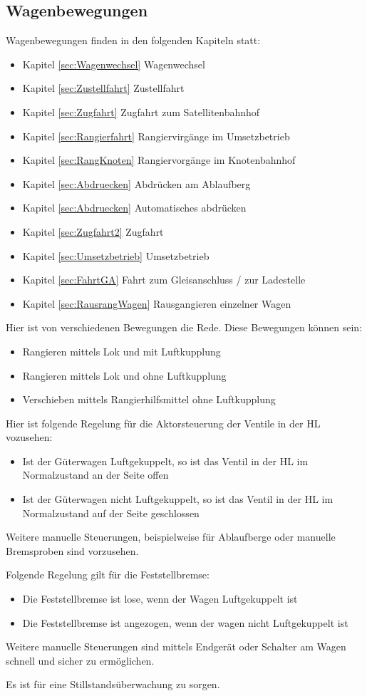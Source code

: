 \subsection{Wagenbewegungen}
Wagenbewegungen finden in den folgenden Kapiteln statt:
\begin{itemize}
    \item Kapitel \ref{sec:Wagenwechsel} Wagenwechsel
    \item Kapitel \ref{sec:Zustellfahrt} Zustellfahrt
    \item Kapitel \ref{sec:Zugfahrt} Zugfahrt zum Satellitenbahnhof
    \item Kapitel \ref{sec:Rangierfahrt} Rangiervirgänge im Umsetzbetrieb
    \item Kapitel \ref{sec:RangKnoten} Rangiervorgänge im Knotenbahnhof
    \item Kapitel \ref{sec:Abdruecken} Abdrücken am Ablaufberg
    \item Kapitel \ref{sec:Abdruecken} Automatisches abdrücken
    \item Kapitel \ref{sec:Zugfahrt2} Zugfahrt
    \item Kapitel \ref{sec:Umsetzbetrieb} Umsetzbetrieb
    \item Kapitel \ref{sec:FahrtGA} Fahrt zum Gleisanschluss / zur Ladestelle
    \item Kapitel \ref{sec:RausrangWagen} Rausgangieren einzelner Wagen
\end{itemize}
Hier ist von verschiedenen Bewegungen die Rede. Diese Bewegungen können sein:
\begin{itemize}
    \item Rangieren mittels Lok und mit Luftkupplung
    \item Rangieren mittels Lok und ohne Luftkupplung
    \item Verschieben mittels Rangierhilfsmittel ohne Luftkupplung
\end{itemize}
Hier ist folgende Regelung für die Aktorsteuerung der Ventile in der HL vozusehen:
\begin{itemize}
    \item Ist der Güterwagen Luftgekuppelt, so ist das Ventil in der HL im Normalzustand an der Seite offen
    \item Ist der Güterwagen nicht Luftgekuppelt, so ist das Ventil in der HL im Normalzustand auf der Seite geschlossen
\end{itemize}
Weitere manuelle Steuerungen, beispielweise für Ablaufberge oder manuelle Bremsproben sind vorzusehen.\par
Folgende Regelung gilt für die Feststellbremse:
\begin{itemize}
    \item Die Feststellbremse ist lose, wenn der Wagen Luftgekuppelt ist
    \item Die Feststellbremse ist angezogen, wenn der wagen nicht Luftgekuppelt ist
\end{itemize}
Weitere manuelle Steuerungen sind mittels Endgerät oder Schalter am Wagen schnell und sicher zu ermöglichen. \par
Es ist für eine Stillstandsüberwachung zu sorgen.
